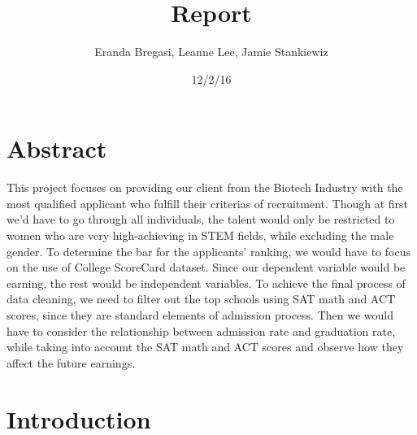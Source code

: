\documentclass{article}
\begin{document}
\title{Report}
\author{Eranda Bregasi, Leanne Lee, Jamie Stankiewiz}
\date{12/2/16}
\maketitle







\section{Abstract}

This project focuses on providing our client from the Biotech Industry with the most qualified applicant who fulfill their criterias of recruitment. Though at first we'd have to go through all individuals, the talent would only be restricted to women who are very high-achieving in STEM fields, while excluding the male gender. To determine the bar for the applicants' ranking, we would have to focus on the use of College ScoreCard dataset. Since our dependent variable would be earning, the rest would be independent variables. To achieve the final process of data cleaning, we need to filter out the top schools using SAT math and ACT scores, since they are standard elements of admission process. Then we would have to consider the relationship between admission rate and graduation rate, while taking into account the SAT math and ACT scores and observe how they affect the future earnings.


\section{Introduction}
\end{document}
